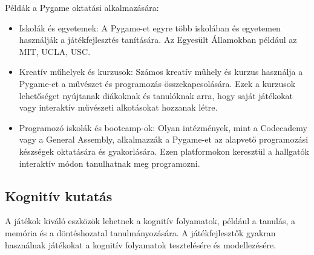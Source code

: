Példák a Pygame oktatási alkalmazására:
\begin{itemize}
    
    \item Iskolák és egyetemek: A Pygame-et egyre több iskolában és egyetemen használják a játékfejlesztés tanítására. Az Egyesült Államokban például az MIT, UCLA, USC.
    
    \item Kreatív műhelyek és kurzusok: Számos kreatív műhely és kurzus használja a Pygame-et a művészet és programozás összekapcsolására. Ezek a kurzusok lehetőséget nyújtanak diákoknak és tanulóknak arra, hogy saját játékokat vagy interaktív művészeti alkotásokat hozzanak létre.

    \item Programozó iskolák és bootcamp-ok: Olyan intézmények, mint a Codecademy vagy a General Assembly, alkalmazzák a Pygame-et az alapvető programozási készségek oktatására és gyakorlására. Ezen platformokon keresztül a hallgatók interaktív módon tanulhatnak meg programozni.

\end{itemize}

\subsection{Kognitív kutatás}
A játékok kiváló eszközök lehetnek a kognitív folyamatok, például a tanulás, a memória és a döntéshozatal tanulmányozására. A játékfejlesztők gyakran használnak játékokat a kognitív folyamatok tesztelésére és modellezésére.

